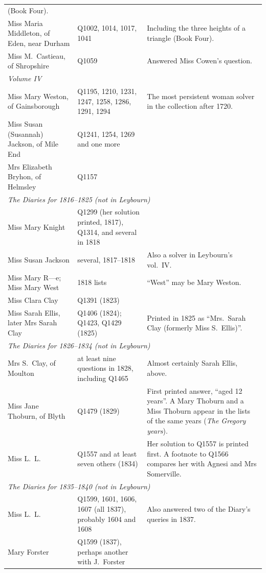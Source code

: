 \documentclass[11pt,a4paper]{article}
\begin{document}
\begin{longtable}{p{4.2cm} p{3.8cm} p{7.2cm}}
  (Book Four).\\
Miss Maria Middleton, of Eden, near Durham & Q1002, 1014, 1017, 1041 & Including the
  three heights of a triangle (Book Four).\\
Miss M.~Castieau, of Shropshire & Q1059 & Answered Miss Cowen's question.\\[4pt]
\multicolumn{3}{l}{\textit{Volume IV}}\\
Miss Mary Weston, of Gainsborough & Q1195, 1210, 1231, 1247, 1258, 1286, 1291, 1294 &
  The most persistent woman solver in the collection after 1720.\\
Miss Susan (Susannah) Jackson, of Mile End & Q1241, 1254, 1269 and one more &\\
Mrs Elizabeth Bryhon, of Helmsley & Q1157 &\\[4pt]
\multicolumn{3}{l}{\textit{The Diaries for 1816--1825 (not in Leybourn)}}\\
Miss Mary Knight & Q1299 (her solution printed, 1817), Q1314, and several in 1818 & \\
Miss Susan Jackson & several, 1817--1818 & Also a solver in Leybourn's vol.~IV.\\
Miss Mary R---e; Miss Mary West & 1818 lists & ``West'' may be Mary Weston.\\
Miss Clara Clay & Q1391 (1823) &\\
Miss Sarah Ellis, later Mrs Sarah Clay & Q1406 (1824); Q1423, Q1429 (1825) & Printed in
  1825 as ``Mrs.\ Sarah Clay (formerly Miss S.~Ellis)''.\\[4pt]
\multicolumn{3}{l}{\textit{The Diaries for 1826--1834 (not in Leybourn)}}\\
Mrs S.~Clay, of Moulton & at least nine questions in 1828, including Q1465 & Almost
  certainly Sarah Ellis, above.\\
Miss Jane Thoburn, of Blyth & Q1479 (1829) & First printed answer, ``aged 12 years''. A
  Mary Thoburn and a Miss Thoburn appear in the lists of the same years
  (\textit{The Gregory years}).\\
Miss L.~L. & Q1557 and at least seven others (1834) & Her solution to Q1557 is printed
  first. A footnote to Q1566 compares her with Agnesi and Mrs Somerville.\\[4pt]
\multicolumn{3}{l}{\textit{The Diaries for 1835--1840 (not in Leybourn)}}\\
Miss L.~L. & Q1599, 1601, 1606, 1607 (all 1837), probably 1604 and 1608 & Also
  answered two of the Diary's queries in 1837.\\
Mary Forster & Q1599 (1837), perhaps another with J.~Forster & \\
\bottomrule
\end{longtable}
\end{document}
